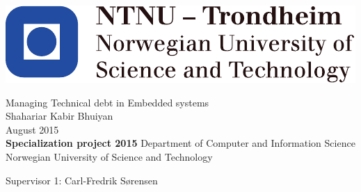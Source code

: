
\thispagestyle{empty}
\includegraphics[scale=1.1]{fig/NTNU}
\mbox{}\\[6pc]
\begin{center}
\Huge{Managing Technical debt in Embedded systems}\\[2pc]

\Large{Shahariar Kabir Bhuiyan}\\[1pc]
\large{August 2015}\\[2pc]

\textbf{Specialization project 2015}
\linebreak
Department of Computer and Information Science\\
Norwegian University of Science and Technology
\end{center}
\vfill

\noindent Supervisor 1: Carl-Fredrik Sørensen

